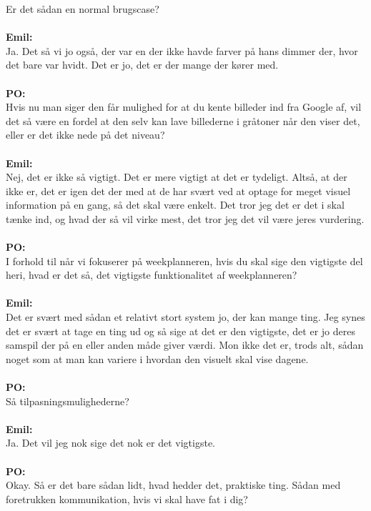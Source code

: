 Er det sådan en normal brugscase?
\\\\
\textbf{Emil:}\\
Ja.
Det så vi jo også, der var en der ikke havde farver på hans dimmer der, hvor det bare var hvidt. 
Det er jo, det er der mange der kører med. 
\\\\
\textbf{PO:}\\
Hvis nu man siger den får mulighed for at du kente billeder ind fra Google af, vil det så være en fordel at den selv kan lave billederne i gråtoner når den viser det, eller er det ikke nede på det niveau?
\\\\
\textbf{Emil:}\\
Nej, det er ikke så vigtigt.
Det er mere vigtigt at det er tydeligt. 
Altså, at der ikke er, det er igen det der med at de har svært ved at optage for meget visuel information på en gang, så det skal være enkelt. 
Det tror jeg det er det i skal tænke ind, og hvad der så vil virke mest, det tror jeg det vil være jeres vurdering.
\\\\
\textbf{PO:}\\
I forhold til når vi fokuserer på weekplanneren, hvis du skal sige den vigtigste del heri, hvad er det så, det vigtigste funktionalitet af weekplanneren?
\\\\
\textbf{Emil:}\\
Det er svært med sådan et relativt stort system jo, der kan mange ting.
Jeg synes det er svært at tage en ting ud og så sige at det er den vigtigste, det er jo deres samspil der på en eller anden måde giver værdi.
Mon ikke det er, trods alt, sådan noget som at man kan variere i hvordan den visuelt skal vise dagene.
\\\\
\textbf{PO:}\\
Så tilpasningsmulighederne?
\\\\
\textbf{Emil:}\\
Ja.
Det vil jeg nok sige det nok er det vigtigste.
\\\\
\textbf{PO:}\\
Okay. Så er det bare sådan lidt, hvad hedder det, praktiske ting. 
Sådan med foretrukken kommunikation, hvis vi skal have fat i dig?
\\\\
